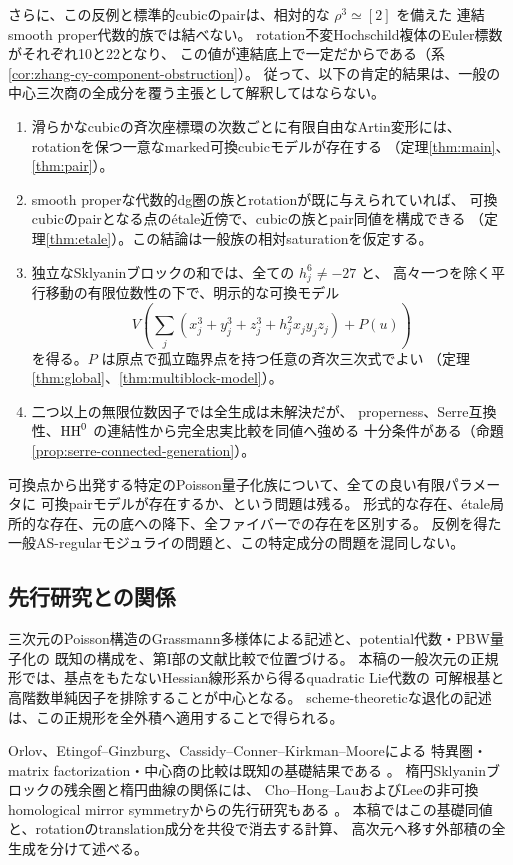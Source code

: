 さらに、この反例と標準的cubicのpairは、相対的な \(\rho^3\simeq[2]\) を備えた
連結smooth proper代数的族では結べない。
rotation不変Hochschild複体のEuler標数がそれぞれ10と22となり、
この値が連結底上で一定だからである（系\ref{cor:zhang-cy-component-obstruction}）。
従って、以下の肯定的結果は、一般の中心三次商の全成分を覆う主張として解釈してはならない。

\begin{enumerate}
 \item 滑らかなcubicの斉次座標環の次数ごとに有限自由なArtin変形には、
 rotationを保つ一意なmarked可換cubicモデルが存在する
 （定理\ref{thm:main}、\ref{thm:pair}）。
 \item smooth properな代数的dg圏の族とrotationが既に与えられていれば、
 可換cubicのpairとなる点のétale近傍で、cubicの族とpair同値を構成できる
 （定理\ref{thm:etale}）。この結論は一般族の相対saturationを仮定する。
 \item 独立なSklyaninブロックの和では、全ての \(h_j^6\ne-27\) と、
 高々一つを除く平行移動の有限位数性の下で、明示的な可換モデル
 \[
 V\!\left(\sum_j(x_j^3+y_j^3+z_j^3+h_j^2x_jy_jz_j)+P(u)\right)
 \]
 を得る。\(P\) は原点で孤立臨界点を持つ任意の斉次三次式でよい
 （定理\ref{thm:global}、\ref{thm:multiblock-model}）。
 \item 二つ以上の無限位数因子では全生成は未解決だが、
 properness、Serre互換性、\(\operatorname{HH}^0\) の連結性から完全忠実比較を同値へ強める
 十分条件がある（命題\ref{prop:serre-connected-generation}）。
\end{enumerate}

可換点から出発する特定のPoisson量子化族について、全ての良い有限パラメータに
可換pairモデルが存在するか、という問題は残る。
形式的な存在、étale局所的な存在、元の底への降下、全ファイバーでの存在を区別する。
反例を得た一般AS-regularモジュライの問題と、この特定成分の問題を混同しない。

\subsection{先行研究との関係}

三次元のPoisson構造のGrassmann多様体による記述と、potential代数・PBW量子化の
既知の構成を、第I部の文献比較で位置づける。
本稿の一般次元の正規形では、基点をもたないHessian線形系から得るquadratic Lie代数の
可解根基と高階数単純因子を排除することが中心となる。
scheme-theoreticな退化の記述は、この正規形を全外積へ適用することで得られる。

Orlov、Etingof--Ginzburg、Cassidy--Conner--Kirkman--Mooreによる
特異圏・matrix factorization・中心商の比較は既知の基礎結果である
\cite{Orlov,EG,CCKM}。
楕円Sklyaninブロックの残余圏と楕円曲線の関係には、
Cho--Hong--LauおよびLeeの非可換homological mirror symmetryからの先行研究もある
\cite{CHL,Lee}。
本稿ではこの基礎同値と、rotationのtranslation成分を共役で消去する計算、
高次元へ移す外部積の全生成を分けて述べる。

